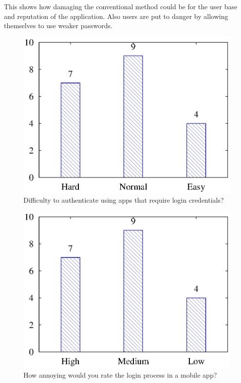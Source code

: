 This shows how damaging the conventional method could be for the user base and reputation of the application. Also users are put to danger by allowing themselves to use weaker passwords.

\begin{figure}[H]
\centering
\includegraphics[scale=.7]{files/question3/question3.eps}
\caption{Difficulty to authenticate using apps that require login credentials?}
\label{fig:digraph}
\end{figure}

\begin{figure}[H]
\centering
\includegraphics[scale=.7]{files/question4/question4.eps}
\caption{How annoying would you rate the login process in a mobile app?}
\label{fig:digraph}
\end{figure}

